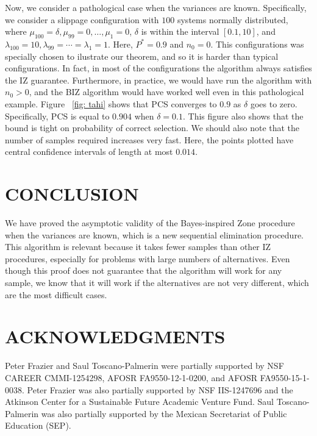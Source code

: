 \documentclass{wscpaperproc}
\theoremstyle{wsc}
\begin{document}
 Now, we consider a pathological case when the variances are known. Specifically, we consider a slippage configuration 
with $100$ systems normally distributed, where $\mu_{100}=\delta,\mu_{99}=0,\dots,\mu_{1}=0$, $\delta$ is 
within the interval $[0.1,10]$, and $\lambda_{100}=10,\lambda_{99}=\cdots=\lambda_{1}=1$. Here, $P^*=0.9$ and $n_{0}=0$.
This configurations was specially chosen to ilustrate our theorem, and so it is harder than typical configurations.
In fact, in most of the configurations the algorithm always satisfies the IZ guarantee. Furthermore, in practice, we would
have run the algorithm with $n_{0}>0$, and the BIZ algorithm would have worked well even in this pathological example. 
Figure ~\ref{fig: tahi} shows that PCS converges to $0.9$ as $\delta$ goes to zero. Specifically, PCS is equal to $0.904$ when $\delta=0.1$.
This figure also shows that the bound is tight  on probability of correct selection. We should also note that the number of samples required increases very fast. 
Here, the points plotted have central confidence intervals of length at most $0.014$. 









\section{CONCLUSION}

We have proved the asymptotic validity of the Bayes-inspired Zone
procedure \cite{Frazier:BIZ} when the variances are known, which is a
new sequential elimination procedure. This algorithm is relevant because
it takes fewer samples than other IZ procedures, especially for problems
with large numbers of alternatives. Even though this proof does not
guarantee that the algorithm will work for any sample, we know that
it will work if the alternatives are not very different, which are
the most difficult cases. 


\section*{ACKNOWLEDGMENTS}
Peter Frazier and Saul Toscano-Palmerin were partially supported by NSF CAREER CMMI-1254298, AFOSR FA9550-12-1-0200, and AFOSR FA9550-15-1-0038.
Peter Frazier was also partially supported by NSF IIS-1247696 and the Atkinson Center for a Sustainable Future Academic Venture Fund.
Saul Toscano-Palmerin was also partially supported by the Mexican Secretariat of Public Education (SEP).
\end{document}
